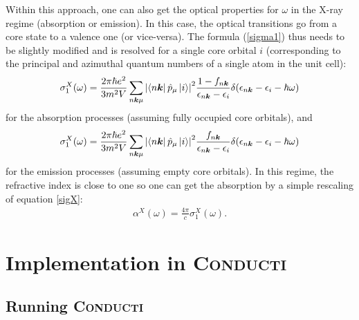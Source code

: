 \documentclass[a4,12pts]{extarticle}
\begin{document}
Within this approach, one can also get the optical properties for $\omega$ in the X-ray regime (absorption or emission). In this case, the optical transitions go from a core state to a valence one (or vice-versa). The formula (\ref{sigma1}) thus needs to be slightly modified and is resolved for a single core orbital $i$ (corresponding to the principal and azimuthal quantum numbers of a single atom in the unit cell):
\begin{align}
\sigma^{X}_1(\omega)=\frac{2\pi\hbar e^{2}}{3m^{2}V}\sum_{n\boldsymbol{k}\mu}\abs{\bra{n\boldsymbol{k}}\hat{p}_{\mu}\ket{i}}^2
\frac{1-f_{n\boldsymbol{k}}}{\epsilon_{n\boldsymbol{k}}-\epsilon_{i}}\delta(\epsilon_{n\boldsymbol{k}}-\epsilon_{i}-\hbar\omega) \label{sigX}
\end{align}
for the absorption processes (assuming fully occupied core orbitals), and
\begin{align}
\sigma^{X}_1(\omega)=\frac{2\pi\hbar e^{2}}{3m^{2}V}\sum_{n\boldsymbol{k}\mu}\abs{\bra{n\boldsymbol{k}}\hat{p}_{\mu}\ket{i}}^2
\frac{f_{n\boldsymbol{k}}}{\epsilon_{n\boldsymbol{k}}-\epsilon_{i}}\delta(\epsilon_{n\boldsymbol{k}}-\epsilon_{i}-\hbar\omega) \label{emisX}
\end{align}
for the emission processes (assuming empty core orbitals). In this regime, the refractive index is close to one so one can get the absorption by a simple rescaling of equation \ref{sigX}:
\begin{align}
\alpha^{X}(\omega)=\frac{4\pi}{c}\sigma^{X}_1(\omega). \label{absX}
\end{align}


\newpage
\section{Implementation in \textsc{\textmd{Conducti}}}

\subsection{Running \textsc{\textmd{Conducti}}}
\end{document}
